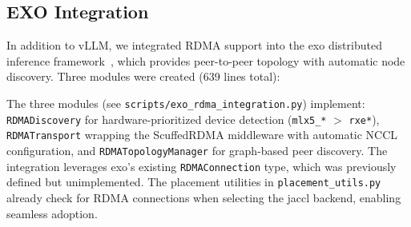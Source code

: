 \documentclass[11pt,letterpaper]{article}
\theoremstyle{definition}
\begin{document}
\begin{table}[htbp]
\centering
\caption{NCCL environment variable configuration by transport type}
\label{tab:nccl-env}
\small
{}
\end{table}

\subsection{EXO Integration}

In addition to vLLM, we integrated RDMA support into the exo distributed inference framework~\cite{exo-github}, which provides peer-to-peer topology with automatic node discovery. Three modules were created (639 lines total):

\begin{table}[htbp]
\centering
\small
{}
\caption{EXO RDMA integration components}
\end{table}

The three modules (see \texttt{scripts/exo\_rdma\_integration.py}) implement: \texttt{RDMADiscovery} for hardware-prioritized device detection (\texttt{mlx5\_*} $>$ \texttt{rxe*}), \texttt{RDMATransport} wrapping the ScuffedRDMA middleware with automatic NCCL configuration, and \texttt{RDMATopologyManager} for graph-based peer discovery. The integration leverages exo's existing \texttt{RDMAConnection} type, which was previously defined but unimplemented. The placement utilities in \texttt{placement\_utils.py} already check for RDMA connections when selecting the jaccl backend, enabling seamless adoption.
\end{document}
